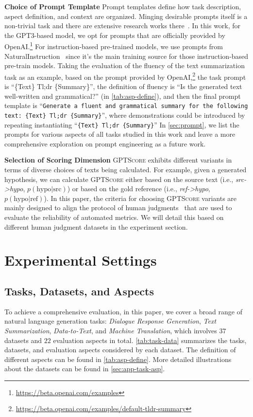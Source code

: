 \textbf{Choice of Prompt Template} \quad Prompt templates define how task description, aspect definition, and context are organized. Minging desirable prompts itself is a non-trivial task and there are extensive research works there~\cite{liu2021pre,fu2022polyglot}. In this work, for the GPT3-based model, we opt for prompts that are officially provided by OpenAI.\footnote{\url{https://beta.openai.com/examples}} For instruction-based pre-trained models, we use prompts from NaturalInstruction~\cite{wang2022super} since it's the main training source for those instruction-based pre-train models. Taking the evaluation of the fluency of the text summarization task as an example, based on the prompt provided by OpenAI,\footnote{\url{https://beta.openai.com/examples/default-tldr-summary}} the task prompt is  ``\{Text\} Tl;dr \{Summary\}'', the definition of fluency is ``Is the generated text well-written and grammatical?'' (in \autoref{tab:asp-define}), and then the final prompt template is ``\texttt{Generate a fluent and grammatical summary for the following text: \{Text\} Tl;dr \{Summary\}}'', where demonstrations could be introduced by repeating instantiating ``\texttt{\{Text\} Tl;dr \{Summary\}}''
In \autoref{sec:prompt}, we list the prompts for various aspects of all tasks studied in this work and leave a more comprehensive exploration on prompt engineering as a future work.

\textbf{Selection of Scoring Dimension} \quad
\textsc{GPTScore} exhibits different variants in terms of diverse choices of texts being calculated. For example, given a generated hypothesis, we can calculate \textsc{GPTScore} either based on the source text (i.e., \textit{src->hypo}, $p(\text{hypo}|\text{src})$) or based on the gold reference (i.e., \textit{ref->hypo}, $p(\text{hypo}|\text{ref})$).
In this paper, the criteria for choosing \textsc{GPTScore} variants are mainly designed to align the protocol of human judgments~\cite{liu2022revisiting} that are used to evaluate the reliability of automated metrics. We will detail this based on different human judgment datasets in the experiment section.

\section{Experimental Settings}

\subsection{Tasks, Datasets, and Aspects}
\label{sec:asp}
To achieve a comprehensive evaluation, in this paper, we cover a broad range of natural language generation tasks:
\textit{Dialogue Response Generation}, \textit{Text Summarization}, \textit{Data-to-Text}, and \textit{Machine Translation}, which involves $37$ datasets and $22$ evaluation aspects in total.
\autoref{tab:task-data} summarizes the tasks, datasets, and evaluation aspects considered by each dataset. The definition of different aspects can be found in \autoref{tab:asp-define}. More detailed illustrations about the datasets can be found in \autoref{sec:app-task-asp}.

